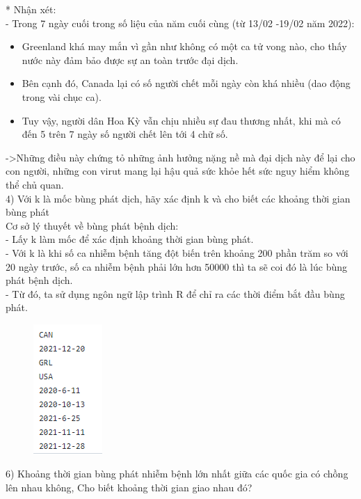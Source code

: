 \documentclass[a4paper]{article}
\theoremstyle{definition}
\begin{document}
\begin{enumerate}[i)]
\begin{figure}[H]
        \end{figure}
        * Nhận xét:\\
        -  Trong 7 ngày cuối trong số liệu của năm cuối cùng (từ 13/02 -19/02 năm 2022):\\
        \begin{itemize}
            \item Greenland khá may mắn vì gần như không có một ca tử vong nào, cho thấy nước này đảm bảo được sự an toàn trước đại dịch.\\
            \item Bên cạnh đó, Canada lại có số người chết mỗi ngày còn khá nhiều (dao động trong vài chục ca).\\
            \item Tuy vậy, người dân Hoa Kỳ vẫn chịu nhiều sự đau thương nhất, khi mà có đến 5 trên 7 ngày số người chết lên tới 4 chữ số.\\
        \end{itemize}
        ->Những điều này chứng tỏ những ảnh hưởng nặng nề mà đại dịch này để lại cho con người, những con virut mang lại hậu quả sức khỏe hết sức nguy hiểm không thể chủ quan.\\
        4) Với k là mốc bùng phát dịch, hãy xác định k và cho biết các khoảng thời gian bùng phát\\
        Cơ sở lý thuyết về bùng phát bệnh dịch:\\
        - Lấy k làm mốc để xác định khoảng thời gian bùng phát.\\
        - Với k là khi số ca nhiễm bệnh tăng đột biến trên khoảng 200 phần trăm so với 20 ngày trước, số ca nhiễm bệnh phải lớn hơn 50000 thì ta sẽ coi đó là lúc bùng phát bệnh dịch.\\
        - Từ đó, ta sử dụng ngôn ngữ lập trình R để chỉ ra các thời điểm bắt đầu bùng phát.
        \begin{figure}[H]
            \centering
            \includegraphics{images/10.4.png}
        \end{figure}
        6) Khoảng thời gian bùng phát nhiễm bệnh lớn nhất giữa các quốc gia có chồng lên nhau không, Cho biết khoảng thời gian giao nhau đó?\\

\end{enumerate}
\end{document}

